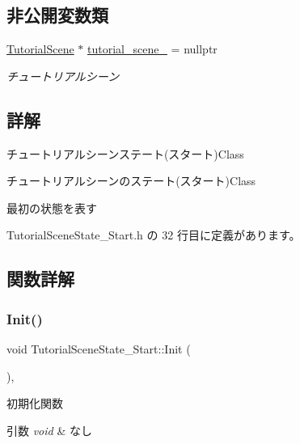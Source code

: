 \subsection*{非公開変数類}
\begin{DoxyCompactItemize}
\item 
\mbox{\hyperlink{class_tutorial_scene}{Tutorial\+Scene}} $\ast$ \mbox{\hyperlink{class_tutorial_scene_state___start_a1fea5f4f4713a1461a86cbc9fc263e41}{tutorial\+\_\+scene\+\_\+}} = nullptr
\begin{DoxyCompactList}\small\item\em チュートリアルシーン \end{DoxyCompactList}\end{DoxyCompactItemize}


\subsection{詳解}
チュートリアルシーンステート(スタート)Class 

チュートリアルシーンのステート(スタート)Class

最初の状態を表す 

 Tutorial\+Scene\+State\+\_\+\+Start.\+h の 32 行目に定義があります。



\subsection{関数詳解}
\mbox{\label{class_tutorial_scene_state___start_acd4cd7e4efeebffa9616d7ca31c7b1c0}} 
\subsubsection{\texorpdfstring{Init()}{Init()}}
{\footnotesize\ttfamily void Tutorial\+Scene\+State\+\_\+\+Start\+::\+Init (\begin{DoxyParamCaption}{ }\end{DoxyParamCaption})\hspace{0.3cm}{\ttfamily [override]}, {\ttfamily [virtual]}}



初期化関数 


\begin{DoxyParams}{引数}
{\em void} & なし \\
\hline
\end{DoxyParams}

